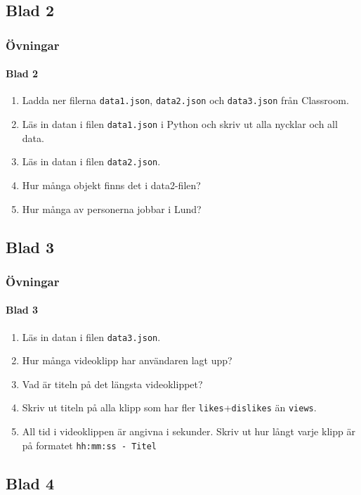 \documentclass[aspectratio=169]{beamer}
\newcounter{uppgifter}
\begin{document}
\subsection{Blad 2}

\begin{frame}
\frametitle{Övningar}
\framesubtitle{Blad 2}

\begin{enumerate}
	\setcounter{enumi}{\value{uppgifter}}
	\item Ladda ner filerna \texttt{data1.json}, \texttt{data2.json} och \texttt{data3.json} från Classroom.
	\item Läs in datan i filen \texttt{data1.json} i Python och skriv ut alla nycklar och all data.
	\item Läs in datan i filen \texttt{data2.json}.
	\item Hur många objekt finns det i data2-filen?
	\item Hur många av personerna jobbar i Lund?
	\setcounter{uppgifter}{\value{enumi}}
\end{enumerate}

\end{frame}

\subsection{Blad 3}

\begin{frame}
\frametitle{Övningar}
\framesubtitle{Blad 3}

\begin{enumerate}
	\setcounter{enumi}{\value{uppgifter}}
	\item Läs in datan i filen \texttt{data3.json}.
	\item Hur många videoklipp har användaren lagt upp?
	\item Vad är titeln på det längsta videoklippet?
	\item Skriv ut titeln på alla klipp som har fler \texttt{likes}+\texttt{dislikes} än \texttt{views}.
	\item All tid i videoklippen är angivna i sekunder. Skriv ut hur långt varje klipp är på formatet \texttt{hh:mm:ss - Titel}
	\setcounter{uppgifter}{\value{enumi}}
\end{enumerate}

\end{frame}

\subsection{Blad 4}
\end{document}
